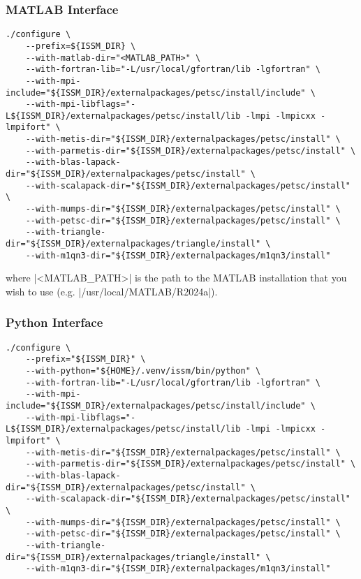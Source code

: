 \subsubsection{MATLAB Interface}
\begin{lstlisting}
./configure \
	--prefix=${ISSM_DIR} \
	--with-matlab-dir="<MATLAB_PATH>" \
	--with-fortran-lib="-L/usr/local/gfortran/lib -lgfortran" \
	--with-mpi-include="${ISSM_DIR}/externalpackages/petsc/install/include" \
	--with-mpi-libflags="-L${ISSM_DIR}/externalpackages/petsc/install/lib -lmpi -lmpicxx -lmpifort" \
	--with-metis-dir="${ISSM_DIR}/externalpackages/petsc/install" \
	--with-parmetis-dir="${ISSM_DIR}/externalpackages/petsc/install" \
	--with-blas-lapack-dir="${ISSM_DIR}/externalpackages/petsc/install" \
	--with-scalapack-dir="${ISSM_DIR}/externalpackages/petsc/install" \
	--with-mumps-dir="${ISSM_DIR}/externalpackages/petsc/install" \
	--with-petsc-dir="${ISSM_DIR}/externalpackages/petsc/install" \
	--with-triangle-dir="${ISSM_DIR}/externalpackages/triangle/install" \
	--with-m1qn3-dir="${ISSM_DIR}/externalpackages/m1qn3/install"
\end{lstlisting}
where \lstinlinebg|<MATLAB_PATH>| is the path to the MATLAB installation that you wish to use (e.g. \lstinlinebg|/usr/local/MATLAB/R2024a|).

\subsubsection{Python Interface}
\begin{lstlisting}
./configure \
	--prefix="${ISSM_DIR}" \
	--with-python="${HOME}/.venv/issm/bin/python" \
	--with-fortran-lib="-L/usr/local/gfortran/lib -lgfortran" \
	--with-mpi-include="${ISSM_DIR}/externalpackages/petsc/install/include" \
	--with-mpi-libflags="-L${ISSM_DIR}/externalpackages/petsc/install/lib -lmpi -lmpicxx -lmpifort" \
	--with-metis-dir="${ISSM_DIR}/externalpackages/petsc/install" \
	--with-parmetis-dir="${ISSM_DIR}/externalpackages/petsc/install" \
	--with-blas-lapack-dir="${ISSM_DIR}/externalpackages/petsc/install" \
	--with-scalapack-dir="${ISSM_DIR}/externalpackages/petsc/install" \
	--with-mumps-dir="${ISSM_DIR}/externalpackages/petsc/install" \
	--with-petsc-dir="${ISSM_DIR}/externalpackages/petsc/install" \
	--with-triangle-dir="${ISSM_DIR}/externalpackages/triangle/install" \
	--with-m1qn3-dir="${ISSM_DIR}/externalpackages/m1qn3/install"
\end{lstlisting}

